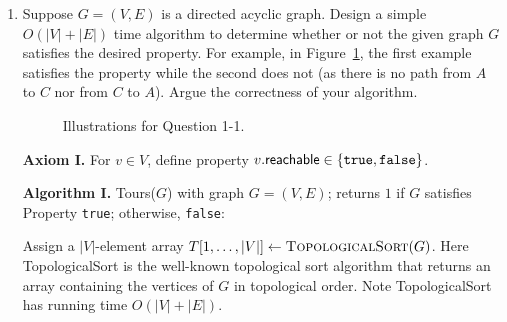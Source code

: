\begin{enumerate}
\item Suppose $G = (V, E)$ is a directed acyclic graph. Design a simple $O(|V|+|E|)$ time algorithm to determine whether or not the given graph $G$ satisfies the desired property. For example, in Figure~\ref{fig:q1-1}, the first example satisfies the property while the second does not (as there is no path from $A$ to $C$ nor from $C$ to $A$).
Argue the correctness of your algorithm.

\begin{figure}[htb]
    \centering
    \caption{Illustrations for Question 1-1.}
    \label{fig:q1-1}
\end{figure}
\begin{solution}

\textbf{Axiom I. }For $v\in V$, define property $v.\mathsf{reachable}\in\{\verb|true|,\verb|false|\}$.

\textbf{Algorithm I. }{\sc Tours}($G$) with graph $G=(V,E)$; returns $1$ if $G$ satisfies Property \verb|true|; otherwise, \verb|false|:

Assign a $|V|$-element array $T[1,\dots,|V|]\leftarrow\textsc{TopologicalSort}(G)$. Here {\sc TopologicalSort} is the well-known topological sort algorithm that returns an array containing the vertices of $G$ in topological order. Note {\sc TopologicalSort} has running time $O(|V|+|E|)$.


\end{solution}
\end{enumerate}

